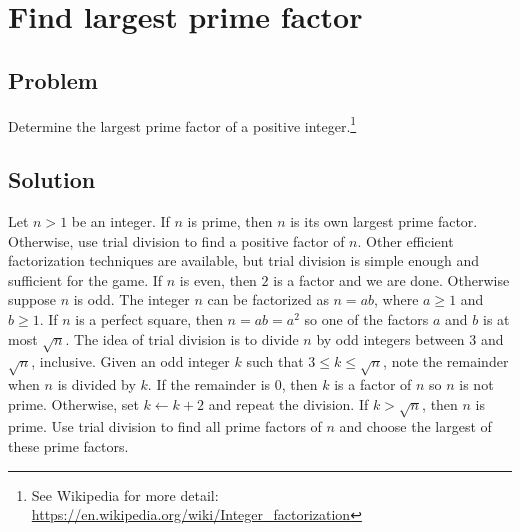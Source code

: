 
\section{Find largest prime factor}



\subsection*{Problem}

Determine the largest prime factor of a positive integer.\footnote{
  See Wikipedia for more detail:
  \url{https://en.wikipedia.org/wiki/Integer_factorization}
}



\subsection*{Solution}

Let $n > 1$ be an integer.  If $n$ is prime, then $n$ is its own
largest prime factor.  Otherwise, use trial division to find a
positive factor of $n$.  Other efficient factorization techniques are
available, but trial division is simple enough and sufficient for the
game.  If $n$ is even, then $2$ is a factor and we are done.
Otherwise suppose $n$ is odd.  The integer $n$ can be factorized as
$n = ab$, where $a \geq 1$ and $b \geq 1$.  If $n$ is a perfect
square, then $n = ab = a^2$ so one of the factors $a$ and $b$ is at
most $\sqrt{n}$.  The idea of trial division is to divide $n$ by odd
integers between $3$ and $\sqrt{n}$, inclusive.  Given an odd integer
$k$ such that $3 \leq k \leq \sqrt{n}$, note the remainder when $n$ is
divided by $k$.  If the remainder is $0$, then $k$ is a factor of $n$
so $n$ is not prime.  Otherwise, set $k \gets k + 2$ and repeat the
division.  If $k > \sqrt{n}$, then $n$ is prime.  Use trial division
to find all prime factors of $n$ and choose the largest of these prime
factors.

\begin{algorithm}[!htbp]

\caption{%
  Determine a factor of an integer.
}
\label{alg:prime:is_prime}
\end{algorithm}
